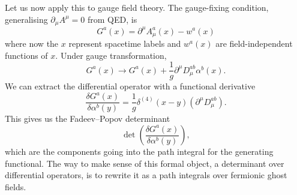 Let us now apply this to gauge field theory. The gauge-fixing condition, generalising $\partial_{\mu} A^{\mu} = 0$ from QED, is
\begin{equation}
  G^{a}(x) = \partial^{\mu} A^{a}_{\mu}(x) - w^{a}(x)
\end{equation}
where now the $x$ represent spacetime labels and $w^{a}(x)$ are field-independent functions of $x$.
Under gauge transformation,
\begin{equation}
  G^{a}(x) \to G^{a}(x) + \frac{1}{g} \partial^{\mu} D^{ab}_{\mu} \alpha^{b}(x).
\end{equation}
We can extract the differential operator with a functional derivative
\begin{equation}
  \frac{\delta G^{a}(x)}{\delta \alpha^{b}(y)} = \frac{1}{g} \delta^{(4)}(x - y) (\partial^{\mu} D_{\mu}^{ab}).
\end{equation}
This gives us the Fadeev--Popov determinant
\begin{equation}
  \det( \frac{\delta G^{a}(x)}{\delta \alpha^{b}(y)} ),
\end{equation}
which are the components going into the path integral for the generating functional.
The way to make sense of this formal object, a determinant over differential operators, is to rewrite it as a path integrals over fermionic ghost fields.
